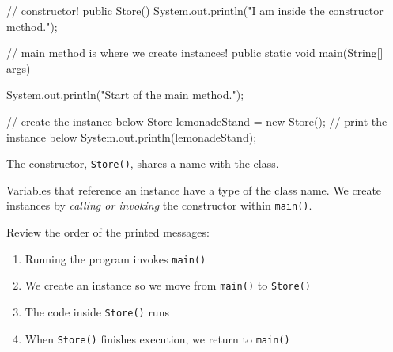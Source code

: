 \documentclass[a4paper,12pt]{article}
\begin{document}
\begin{enumerate}
\begin{javacode}
{  // constructor!
  public Store() {
    System.out.println("I am inside the constructor method.");
  }
  
  // main method is where we create instances!
  public static void main(String[] args) {
    System.out.println("Start of the main method.");
    
    // create the instance below
    Store lemonadeStand = new Store();
    // print the instance below
    System.out.println(lemonadeStand);
  }
}
\end{javacode}
The constructor, \verb|Store()|, shares a name with the class. 

Variables that reference an instance have a type of the class name. We create instances by \textit{calling or invoking} the constructor within \verb|main()|.

Review the order of the printed messages:
\renewcommand{\labelenumii}{$\diamond$}
\begin{enumerate}
\item Running the program invokes \verb|main()|

\item We create an instance so we move from \verb|main()| to \verb|Store()|

\item The code inside \verb|Store()| runs

\item When \verb|Store()| finishes execution, we return to \verb|main()|

\end{enumerate}


\end{enumerate}



\end{document}
